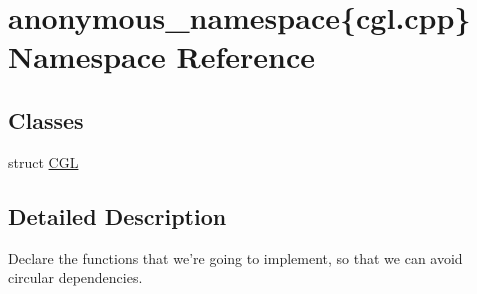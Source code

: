 \hypertarget{namespaceanonymous__namespace_02cgl_8cpp_03}{\section{anonymous\-\_\-namespace\{cgl.\-cpp\} Namespace Reference}
\label{namespaceanonymous__namespace_02cgl_8cpp_03}
}
\subsection*{Classes}
\begin{DoxyCompactItemize}
\item 
struct \hyperlink{structanonymous__namespace_02cgl_8cpp_03_1_1CGL}{C\-G\-L}
\end{DoxyCompactItemize}


\subsection{Detailed Description}
Declare the functions that we're going to implement, so that we can avoid circular dependencies. 